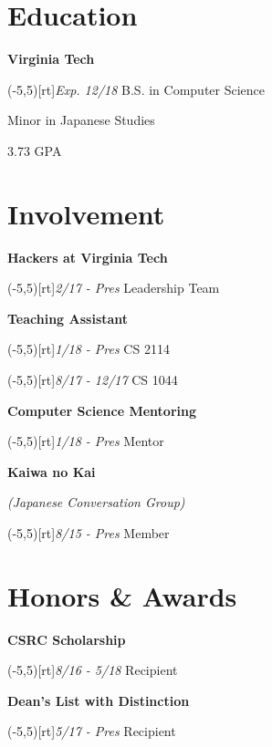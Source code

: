 \documentclass[9pt]{extarticle}
\newcommand{\Subsection}[2]{
    {\normalsize\color{subsection}\textbf{#1}}
    \begin{trivlist}
        \color{bullet}
        #2
    \end{trivlist}
}
\newcommand{\ChronoItem}[2]{
    \item {%
        \makebox(-5,5)[rt]{\footnotesize\color{setting}\textit{#2}}%
        \color{bullet}#1
    }
}
\newcommand{\vsubspace}{\vspace{1.5em}}
\newcommand{\vmainspace}{\vspace{2em}}
\begin{document}
\begin{paracol}{2}
\begin{rightcolumn}
        \section{Education}
            \Subsection{Virginia Tech}{
                \ChronoItem{B.S. in Computer Science}{Exp. 12/18}
                \item Minor in Japanese Studies
                \item 3.73 GPA
            }
        \vmainspace
        \section{Involvement}
            \Subsection{Hackers at Virginia Tech}{
                \ChronoItem{Leadership Team}{2/17 - Pres}
            }
            \vsubspace
            \Subsection{Teaching Assistant}{
                \ChronoItem{CS 2114}{1/18 - Pres}
                \ChronoItem{CS 1044}{8/17 - 12/17}
            }
            \vsubspace
            \Subsection{Computer Science Mentoring}{
                \ChronoItem{Mentor}{1/18 - Pres}
            }
            \vsubspace
            \Subsection{Kaiwa no Kai}{
                \item {\color{info}\textit{(Japanese Conversation Group)}}
                \ChronoItem{Member}{8/15 - Pres}
            }
        \vmainspace
        \section{Honors \& Awards}
            \Subsection{CSRC Scholarship}{
                \ChronoItem{Recipient}{8/16 - 5/18}
            }
            \vsubspace
            \Subsection{Dean's List with Distinction}{
                \ChronoItem{Recipient}{5/17 - Pres}
            }
    \end{rightcolumn}
\end{paracol}
\end{document}
